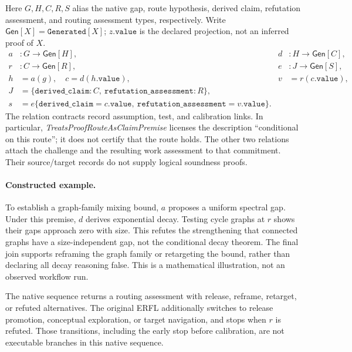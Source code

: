 Here $G,H,C,R,S$ alias the native gap, route hypothesis, derived claim,
refutation assessment, and routing assessment types, respectively. Write
$\mathsf{Gen}[X]=\mathtt{Generated}[X]$; $z.\mathtt{value}$ is the declared
projection, not an inferred proof of $X$.
\[
\begin{aligned}
 a &:G\to\mathsf{Gen}[H],&d &:H\to\mathsf{Gen}[C],\\
 r &:C\to\mathsf{Gen}[R],&e &:J\to\mathsf{Gen}[S],\\
 h&=a(g),\quad c=d(h.\mathtt{value}),&v&=r(c.\mathtt{value}),\\
 J&=\{\mathtt{derived\_claim}:C,\ \mathtt{refutation\_assessment}:R\},\\
 s&=e\{\mathtt{derived\_claim}=c.\mathtt{value},\
       \mathtt{refutation\_assessment}=v.\mathtt{value}\}.
\end{aligned}
\]
The relation contracts record assumption, test, and calibration links. In
particular, \emph{Treats\allowbreak Proof\allowbreak Route\allowbreak As\allowbreak Claim\allowbreak Premise} licenses the description
``conditional on this route''; it does not certify that the route holds. The
other two relations attach the challenge and the resulting work assessment to
that commitment. Their source/target records do not supply logical soundness
proofs.

\paragraph{Constructed example.}
To establish a graph-family mixing bound, $a$ proposes a uniform spectral gap.
Under this premise, $d$ derives exponential decay. Testing cycle graphs at $r$
shows their gaps approach zero with size. This refutes the strengthening that
connected graphs have a size-independent gap, not the conditional decay theorem.
The final join supports reframing the
graph family or retargeting the bound, rather than declaring all decay reasoning
false. This is a mathematical illustration, not an observed workflow run.

The native sequence returns a routing assessment with release, reframe,
retarget, or refuted alternatives. The original ERFL additionally switches to
release promotion, conceptual exploration, or target navigation, and stops when
$r$ is refuted. Those transitions, including the early stop before calibration,
are not executable branches in this native sequence.



